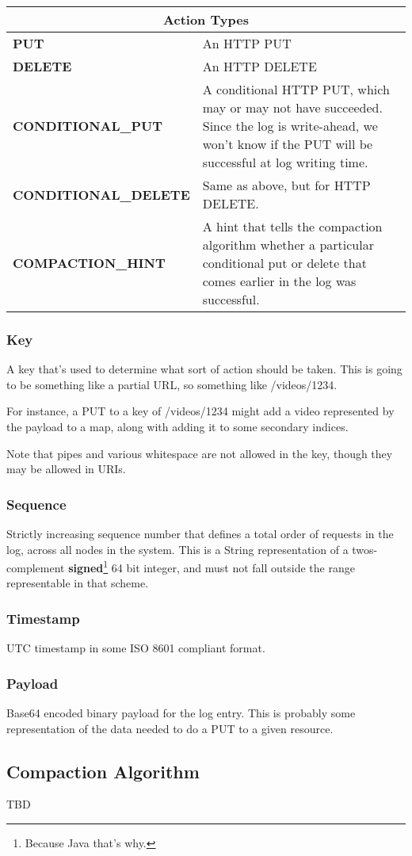 \begin{center}
\begin{tabular}{|l|p{3.5in}|}
\hline
\multicolumn{2}{|c|}{Action  Types}\\ \hline
\textbf{PUT} & An HTTP PUT\\ \hline
\textbf{DELETE} & An HTTP DELETE\\ \hline
\textbf{CONDITIONAL\_PUT} & A conditional HTTP PUT, which may or may not have succeeded.   Since the log is write-ahead, we won’t know if the PUT will be successful at log writing time.\\ \hline
\textbf{CONDITIONAL\_DELETE} & Same as above, but for HTTP DELETE.\\ \hline
\textbf{COMPACTION\_HINT} & A hint that tells the compaction algorithm whether a particular conditional put or delete that comes earlier in the log was successful.\\ \hline
\end{tabular}
\end{center}

\subsubsection{Key}
A key that’s used to determine what sort of action should be taken.  This is going to be something like a partial URL, so something like /videos/1234.

For instance, a PUT to a key of /videos/1234 might add a video represented by the payload to a map, along with adding it to some secondary indices.  

Note that pipes and various whitespace are not allowed in the key, though they may be allowed in URIs.

\subsubsection{Sequence}
Strictly increasing sequence number that defines a total order of requests in the log, across all nodes in the system.  This is a String representation of a twos-complement \textbf{signed}\footnote{Because Java that’s why.} 64 bit integer, and must not fall outside the range representable in that scheme.

\subsubsection{Timestamp}
UTC timestamp in some ISO 8601 compliant format.

\subsubsection{Payload}
Base64 encoded binary payload for the log entry.  This is probably some representation of the data needed to do a PUT to a given resource.


\subsection{Compaction Algorithm}
TBD



